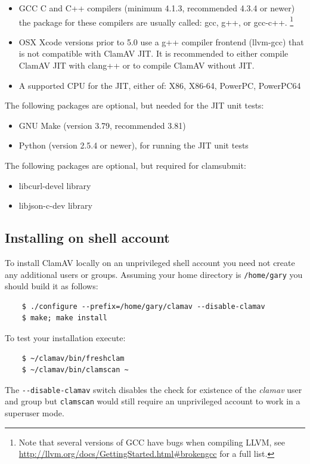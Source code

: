 \documentclass[a4paper,titlepage,12pt]{article}
\begin{document}
    \begin{itemize}
        \item GCC C and C++ compilers (minimum 4.1.3, recommended 4.3.4 or newer)\\
	    the package for these compilers are usually called: gcc, g++, or gcc-c++.
	    \footnote{Note that several versions of GCC have bugs when compiling LLVM, see
		\url{http://llvm.org/docs/GettingStarted.html#brokengcc} for a
		    full list.}
	\item OSX Xcode versions prior to 5.0 use a g++ compiler frontend (llvm-gcc) that is not 
	    compatible with ClamAV JIT. It is recommended to either compile ClamAV JIT with 
	    clang++ or to compile ClamAV without JIT.
	\item A supported CPU for the JIT, either of: X86, X86-64, PowerPC, PowerPC64
    \end{itemize}
    The following packages are optional, but needed for the JIT unit tests:
    \begin{itemize}
     \item GNU Make (version 3.79, recommended 3.81)
     \item Python (version 2.5.4 or newer), for running the JIT unit tests
    \end{itemize}
    The following packages are optional, but required for clamsubmit:
    \begin{itemize}
     \item libcurl-devel library
     \item libjson-c-dev library
    \end{itemize}

    \subsection{Installing on shell account}
    To install ClamAV locally on an unprivileged shell account you need not
    create any additional users or groups. Assuming your home directory is
    \verb+/home/gary+ you should build it as follows:
    \begin{verbatim}
	$ ./configure --prefix=/home/gary/clamav --disable-clamav
	$ make; make install
    \end{verbatim}
    To test your installation execute:
    \begin{verbatim}
	$ ~/clamav/bin/freshclam
	$ ~/clamav/bin/clamscan ~
    \end{verbatim}
    The \verb+--disable-clamav+ switch disables the check for existence of
    the \emph{clamav} user and group but \verb+clamscan+ would still require an
    unprivileged account to work in a superuser mode.
\end{document}
